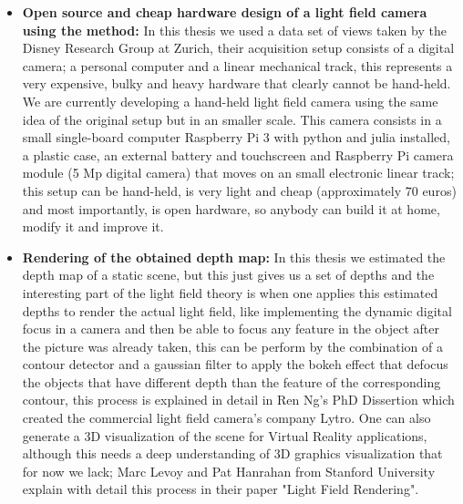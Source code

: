\begin{itemize}
\item \textbf{Open source and cheap hardware design of a light field camera using the method:} In this thesis we used a data set of views taken by the Disney Research Group at Zurich, their acquisition setup consists of a digital camera; a personal computer and a linear mechanical track, this represents a very expensive, bulky and heavy hardware that clearly cannot be hand-held. We are currently developing a hand-held light field camera using the same idea of the original setup but in an smaller scale. This camera consists in a small single-board computer Raspberry Pi 3 with python and julia installed, a plastic case, an external battery and touchscreen and Raspberry Pi camera module (5 Mp digital camera) that moves on an small electronic linear track; this setup can be hand-held, is very light and cheap (approximately 70 euros) and most importantly, is open hardware, so anybody can build it at home, modify it and improve it. 

\item \textbf{Rendering of the obtained depth map:} In this thesis we estimated the depth map of a static scene, but this just gives us a set of depths and the interesting part of the light field theory is when one applies this estimated depths to render the actual light field, like implementing the dynamic digital focus in a camera and then be able to focus any feature in the object after the picture was already taken, this can be perform by the combination of a contour detector and a gaussian filter to apply the bokeh effect that defocus the objects that have different depth than the feature of the corresponding contour, this process is explained in detail in Ren Ng's PhD Dissertion\cite{RenNg} which created the commercial light field camera's company Lytro. One can also generate a 3D visualization of the scene for Virtual Reality applications, although this needs a deep understanding of 3D graphics visualization that for now we lack; Marc Levoy and Pat Hanrahan from Stanford University explain with detail this process in their paper "Light Field Rendering"\cite{LF-rendering}.


\end{itemize}
